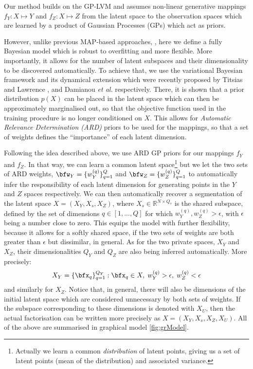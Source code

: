 \par Our method builds on the GP-LVM and assumes non-linear generative
mappings $f_Y: X \mapsto Y$ and $f_Z: X \mapsto Z$ from the latent
space to the observation spaces which are learned by a product of
Gaussian Processes (GPs) which act as priors.  

However, unlike
previous MAP-based approaches, \eg \cite{Shon:2006wr}, here we define
a fully Bayesian model which is robust to overfitting and more
flexible. More importantly, it allows for the number of latent
subspaces and their dimensionality to be discovered automatically. To
achieve that, we use the variational Bayesian framework and its
dynamical extension which were recently proposed by Titsias and
Lawrence \cite{Titsias:bayesGPLVM10}, and Damianou \textit{et al.}
\cite{Damianou:vgpds11} respectively.  There, it is shown that a prior
distribution $p(X)$ can be placed in the latent space which can then
be approximately marginalised out, so that the objective function used
in the training procedure is no longer conditioned on $X$. This allows
for \emph{Automatic Relevance Determination (ARD)} priors
\cite{Rasmussen:book06} to be used for the mappings, so that a set of
weights defines the ``importance'' of each latent dimension.

\par Following the idea described above, we use ARD GP priors for our
mappings $f_Y$ and $f_Z$. In that way, we can learn a common latent
space\footnote{Actually we learn a common \emph{distribution} of
  latent points, giving us a set of latent points (mean of the
  distribution) and associated variance.} but we let the two sets of
ARD weights, $\bfw_Y = \{ w^{(q)}_Y \}_{q=1}^Q$ and $\bfw_Z = \{
w^{(q)}_Z \}_{q=1}^Q$ to automatically infer the responsibility of
each latent dimension for generating points in the $Y$ and $Z$ spaces
respectively.  We can then automatically recover a segmentation of the
latent space $X = \left( X_Y, X_s, X_Z \right)$, where $X_s \in
\mathbb{R}^{N \times Q_s}$ is the shared subspace, defined by the set
of dimensions $q \in [1, ... ,Q]$ for which $w_Y^{(q)}, w_Z^{(q)} >
\epsilon$, with $\epsilon$ being a number close to zero. This equips
the model with further flexibility, because
it allows for a softly shared space, if the two sets of weights are
both greater than $\epsilon$ but dissimilar, in general.  As for the
two private spaces, $X_Y$ and $X_Z$, their dimensionalities $Q_Y$ and
$Q_Z$ are also being inferred automatically.  More precisely:
\begin{equation}
X_Y = \{ \bfx_q \}_{q=1}^{Q_Y}: \bfx_q \in X, \; w_Y^{(q)} > \epsilon, \;  w_Z^{(q)} < \epsilon
\end{equation}
and similarly for $X_Z$.  Notice that, in general, there will also be
dimensions of the initial latent space which are considered
unnecessary by both sets of weights. If the subspace corresponding to
these dimensions is denoted with $X_U$, then the actual factorisation
can be written more precisely as $X = \left( X_Y, X_s, X_Z, X_U
\right)$.  All of the above are summarised in graphical model
\ref{fig:grModel}.

